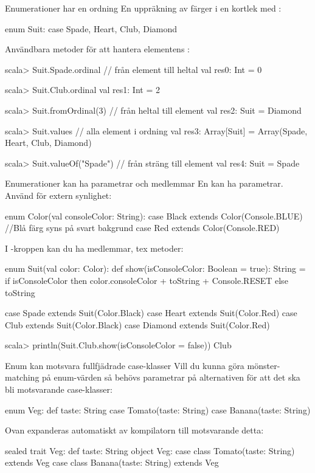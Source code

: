 

\SlideFontSmall
\begin{Slide}{Enumerationer har en ordning}
En uppräkning av färger i en kortlek med :
\begin{Code}
enum Suit:
  case Spade, Heart, Club, Diamond 
\end{Code}
Användbara metoder för att hantera elementens :
\begin{REPLsmall}
scala> Suit.Spade.ordinal      // från element till heltal
val res0: Int = 0

scala> Suit.Club.ordinal
val res1: Int = 2

scala> Suit.fromOrdinal(3)    // från heltal till element
val res2: Suit = Diamond

scala> Suit.values            // alla element i ordning
val res3: Array[Suit] = Array(Spade, Heart, Club, Diamond)

scala> Suit.valueOf("Spade")  // från sträng till element
val res4: Suit = Spade
\end{REPLsmall}
\end{Slide}

\begin{Slide}{Enumerationer kan ha parametrar och medlemmar}
En  kan ha parametrar. Använd  för extern synlighet:  
\begin{Code}
enum Color(val consoleColor: String): 
  case Black extends Color(Console.BLUE) //Blå färg syns på svart bakgrund
  case Red   extends Color(Console.RED)
\end{Code}
I -kroppen kan du ha medlemmar, tex metoder:
\begin{Code}
enum Suit(val color: Color):
  def show(isConsoleColor: Boolean = true): String = 
    if isConsoleColor then color.consoleColor + toString + Console.RESET
    else toString

  case Spade   extends Suit(Color.Black)
  case Heart   extends Suit(Color.Red)
  case Club    extends Suit(Color.Black) 
  case Diamond extends Suit(Color.Red)
\end{Code}
\begin{REPLsmall}
scala> println(Suit.Club.show(isConsoleColor = false)) 
Club
\end{REPLsmall}
\end{Slide}

\begin{Slide}{Enum kan motsvara fullfjädrade case-klasser}
Vill du kunna göra mönster-matching på enum-värden så behövs parametrar på alternativen för att det ska bli motsvarande case-klasser: 
\begin{Code}
enum Veg:
  def taste: String
  case Tomato(taste: String)
  case Banana(taste: String)
\end{Code}
Ovan expanderas automatiskt av kompilatorn till motsvarande detta:
\begin{Code}
sealed trait Veg:
  def taste: String
object Veg:
  case class Tomato(taste: String) extends Veg
  case class Banana(taste: String) extends Veg
\end{Code}
\end{Slide}

